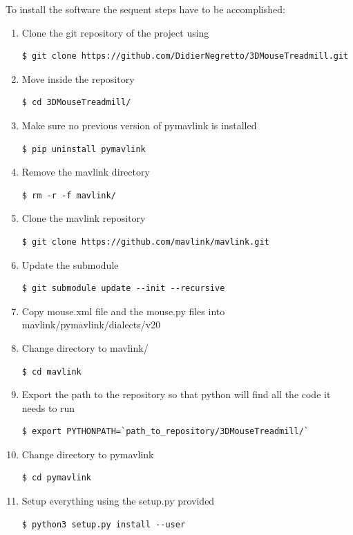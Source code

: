 \documentclass[12pt,a4paper]{article}
\begin{document}
To install the software the sequent steps have to be accomplished:
\begin{enumerate}
	\item Clone the git repository of the project using 
	\begin{lstlisting}[style = Bashstyle]
		$ git clone https://github.com/DidierNegretto/3DMouseTreadmill.git
	\end{lstlisting}
	\item Move inside the repository
	\begin{lstlisting}[style = Bashstyle]
		$ cd 3DMouseTreadmill/
	\end{lstlisting}
	\item Make sure no previous version of pymavlink is installed
	\begin{lstlisting}[style = Bashstyle]
		$ pip uninstall pymavlink
	\end{lstlisting}
	\item Remove the mavlink directory
	\begin{lstlisting}[style = Bashstyle]
		$ rm -r -f mavlink/
	\end{lstlisting}
	\item Clone the mavlink repository
	\begin{lstlisting}[style = Bashstyle]
		$ git clone https://github.com/mavlink/mavlink.git
	\end{lstlisting}
	\item Update the submodule
	\begin{lstlisting}[style = Bashstyle]
		$ git submodule update --init --recursive
	\end{lstlisting}
	\item Copy mouse.xml file and the mouse.py files into mavlink/pymavlink/dialects/v20 
	\item Change directory to mavlink/
	\begin{lstlisting}[style = Bashstyle]
		$ cd mavlink
	\end{lstlisting}
	\item Export the path to the repository so that python will find all the code it needs to run
	\begin{lstlisting}[style = Bashstyle]
		$ export PYTHONPATH=`path_to_repository/3DMouseTreadmill/`
	\end{lstlisting}
	\item Change directory to pymavlink
	\begin{lstlisting}[style = Bashstyle]
		$ cd pymavlink
	\end{lstlisting}
	\item Setup everything using the setup.py provided
	\begin{lstlisting}[style = Bashstyle]
		$ python3 setup.py install --user
	\end{lstlisting}
	
\end{enumerate}
\end{document}
